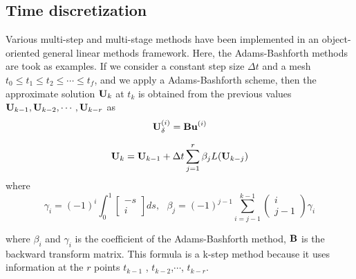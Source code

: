 \subsection*{Time discretization}
Various multi-step and multi-stage methods have been implemented in an object-oriented general linear methods framework. Here, the Adams-Bashforth methods are took as examples. 
If we consider a constant step size $\Delta t$ and a mesh $t_0 \leq t_1 \leq t_2 \leq \cdots \leq t_f $, and we apply a Adams-Bashforth scheme, then the approximate solution $\textbf U_k$ at $t_k$ is obtained from the previous values $\textbf U_{k-1},\textbf U_{k-2},\cdots,\textbf U_{k-r}$ as
\begin{equation}
\textbf U^{(i)}_\delta = \textbf {Bu}^{(i)}
\end{equation}

\begin{equation}
\textbf U_k =\textbf U_{k-1}+\Delta t \sum^r_{j=1}\beta _jL(\textbf U_{k-j})
\end{equation}
where 
\begin{equation}
\gamma_i=(-1)^i\int^1_0\begin{bmatrix} -s \\ i \end{bmatrix}ds,
\ \ \ 
\beta_j = (-1)^{j-1}\sum^{k-1}_{i=j-1}\begin{pmatrix} i \\ j-1 \end{pmatrix}\gamma_i
\end{equation}


where $\beta_{i}$ and $\gamma_i$ is the coefficient of the Adams-Bashforth method,  $\textbf B$ is the backward transform matrix. This formula is a k-step method because it uses information at the $r$ points $t_{k-1}$ , $t_{k-2}$,$\cdots$, $t_{k-r}$. 
